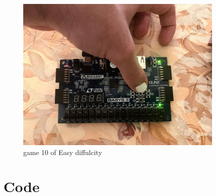 \documentclass[11pt]{article}
\begin{document}
\begin{figure}
	\includegraphics[width=0.9\textwidth]{IMG_1320.jpg}
	\caption{game 10 of Easy diffulcity }
	\label{fig:sim_with_table}
\end{figure}


\clearpage
\section*{Code}
\end{document}

